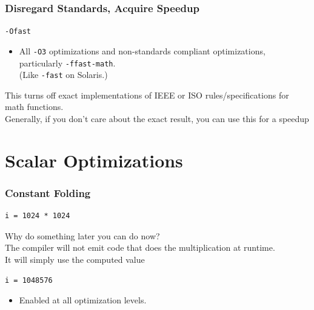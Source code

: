 \documentclass[aspectratio=43]{beamer}
\newenvironment{changemargin}[1]{%
  \begin{list}{}{%
    \setlength{\topsep}{0pt}%
    \setlength{\leftmargin}{#1}%
    \setlength{\rightmargin}{1em}
    \setlength{\listparindent}{\parindent}%
    \setlength{\itemindent}{\parindent}%
    \setlength{\parsep}{\parskip}%
  }%
  \item[]}{\end{list}}
\begin{document}
\begin{frame}[fragile]
  \frametitle{Disregard Standards, Acquire Speedup}

  \begin{changemargin}{2cm}
  {\tt -Ofast}

  \begin{itemize}
    \item All {\tt -O3} optimizations and non-standards compliant optimizations,
      particularly {\tt -ffast-math}. \\ 
 (Like {\tt -fast} on Solaris.)
  \end{itemize}
  This turns off exact implementations of IEEE or ISO rules/specifications for math
  functions.\\[1em]

  Generally, if you don't care about the exact result, you can use this for
  a speedup
  \end{changemargin}
\end{frame}

\section{Scalar Optimizations}
\begin{frame}[fragile]
  \frametitle{Constant Folding}

  \begin{changemargin}{2cm}
  \begin{lstlisting}
i = 1024 * 1024
  \end{lstlisting}

  Why do something later you can do now?\\[1em]

  The compiler will not emit code that does the multiplication at runtime.\\
  It will simply use the computed value

  \begin{lstlisting}
i = 1048576
  \end{lstlisting}

  \begin{itemize}
    \item Enabled at all optimization levels.
  \end{itemize}
  \end{changemargin}
\end{frame}
\end{document}
